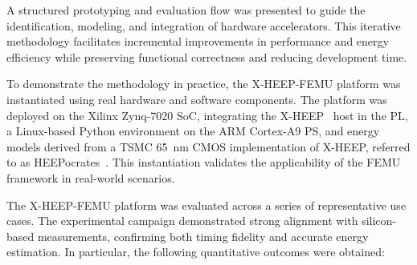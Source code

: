         A structured prototyping and evaluation flow was presented to guide the identification, modeling, and integration of hardware accelerators. This iterative methodology facilitates incremental improvements in performance and energy efficiency while preserving functional correctness and reducing development time.
        
        To demonstrate the methodology in practice, the \mbox{X-HEEP-FEMU} platform was instantiated using real hardware and software components. The platform was deployed on the Xilinx Zynq-7020 SoC, integrating the \mbox{X-HEEP}~\cite{x-heep} host in the PL, a Linux-based Python environment on the ARM Cortex-A9 PS, and energy models derived from a TSMC \SI{65}{\nano\meter} CMOS implementation of \mbox{X-HEEP}, referred to as \mbox{HEEPocrates}~\cite{heepocrates}. This instantiation validates the applicability of the \mbox{FEMU} framework in real-world scenarios.
        
        The \mbox{X-HEEP-FEMU} platform was evaluated across a series of representative use cases. The experimental campaign demonstrated strong alignment with silicon-based measurements, confirming both timing fidelity and accurate energy estimation. In particular, the following quantitative outcomes were obtained:


